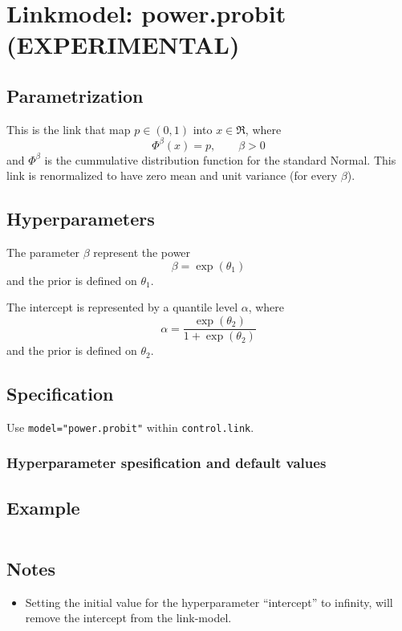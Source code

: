 \documentclass[a4paper,11pt]{article}
\begin{document}
\section*{Linkmodel: power.probit (EXPERIMENTAL)}

\subsection*{Parametrization}

This is the link that map $p\in (0,1)$ into $x\in\Re$, where
\begin{displaymath}
    \Phi^{\beta}(x) = p, \qquad \beta > 0
\end{displaymath}
and $\Phi^{\beta}$ is the cummulative distribution function for the
standard Normal. This link is renormalized to have zero mean and unit
variance (for every $\beta$).

\subsection*{Hyperparameters}

The parameter $\beta$ represent the power
\begin{displaymath}
    \beta = \exp(\theta_1)
\end{displaymath}
and the prior is defined on $\theta_1$. 

The intercept is represented by a quantile level $\alpha$, where
\begin{displaymath}
    \alpha = \frac{\exp(\theta_2)}{1 + \exp(\theta_2)}
\end{displaymath}
and the prior is defined on $\theta_2$.

\subsection*{Specification}

Use \texttt{model="power.probit"} within \texttt{control.link}.  

\subsubsection*{Hyperparameter spesification and default values}


\subsection*{Example}

\begin{verbatim}
\end{verbatim}

\subsection*{Notes}

\begin{itemize}
\item Setting the initial value for the hyperparameter ``intercept''
    to infinity, will remove the intercept from the link-model.
\end{itemize}
\end{document}
